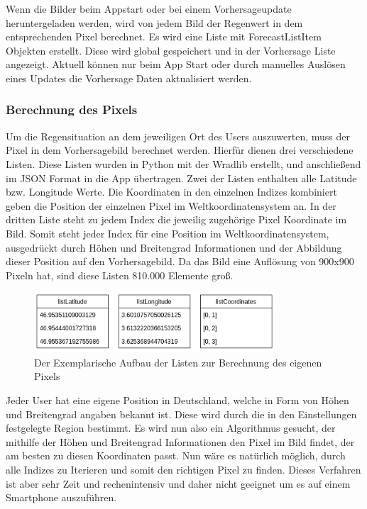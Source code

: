 Wenn die Bilder beim Appstart oder bei einem Vorhersageupdate heruntergeladen werden, wird von jedem Bild der Regenwert 
in dem entsprechenden Pixel berechnet. 
Es wird eine Liste mit ForecastListItem Objekten erstellt. Diese wird global gespeichert und in der Vorhersage Liste angezeigt. 
Aktuell können nur beim App Start oder durch manuelles Auslösen eines Updates die Vorhersage Daten aktualisiert werden.  

\subsubsection{Berechnung des Pixels} \label{sec: pixel_berechnung}
Um die Regensituation an dem jeweiligen Ort des Users auszuwerten, muss der Pixel in dem Vorhersagebild berechnet werden. 
Hierfür dienen drei verschiedene Listen. Diese Listen wurden in Python mit der Wradlib erstellt, und anschließend 
im JSON Format in die App übertragen. 
Zwei der Listen enthalten alle Latitude bzw. Longitude Werte.
Die Koordinaten in den einzelnen Indizes kombiniert geben die Position der einzelnen Pixel im Weltkoordinatensystem an.
In der dritten Liste steht zu jedem Index die jeweilig zugehörige Pixel Koordinate im Bild. 
Somit steht jeder Index für eine Position im Weltkoordinatensystem, ausgedrückt durch Höhen und Breitengrad Informationen
und der Abbildung dieser Position auf den Vorhersagebild.
Da das Bild eine Auflösung von 900x900 Pixeln hat, sind diese Listen 810.000 Elemente groß.
\begin{figure}[H]
  \centering
  \includegraphics[width=0.8\textwidth,angle=0]{abb/listen_pixel_berechnung.png}
  \caption{Der Exemplarische Aufbau der Listen zur Berechnung des eigenen Pixels}
 \label{fig:sequence_diagram_app_start}
 \end{figure}
 Jeder User hat eine eigene Position in Deutschland, welche in Form von Höhen und Breitengrad angaben bekannt ist. 
 Diese wird durch die in den Einstellungen festgelegte Region bestimmt. 
 Es wird nun also ein Algorithmus gesucht, der mithilfe der Höhen und Breitengrad Informationen den Pixel im Bild findet, 
 der am besten zu diesen Koordinaten passt. 
 Nun wäre es natürlich möglich, durch alle Indizes zu Iterieren und somit den richtigen Pixel zu finden. Dieses Verfahren 
 ist aber sehr Zeit und rechenintensiv und daher nicht geeignet um es auf einem Smartphone auszuführen.

